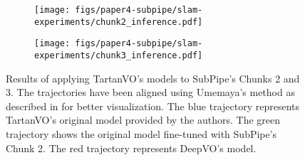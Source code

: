 \begin{figure}[ht]
    \centering
    \begin{subfigure}[b]{0.48\textwidth}
        \centering
        \texttt{[image: figs/paper4-subpipe/slam-experiments/chunk2\_inference.pdf]}
        \caption{}
    \end{subfigure}
    \hfill
    \begin{subfigure}[b]{0.48\textwidth}
        \centering
        \texttt{[image: figs/paper4-subpipe/slam-experiments/chunk3\_inference.pdf]}
        \caption{}
    \end{subfigure}
    \caption[Results of applying TartanVO's and DeepVO models in SubPipe]{Results of applying TartanVO's models to SubPipe's Chunks 2 and 3. The trajectories have been aligned using Umemaya's method as described in \cite{grupp2017evo} for better visualization. The blue trajectory represents TartanVO's original model provided by the authors. The green trajectory shows the original model fine-tuned with SubPipe's Chunk 2. The red trajectory represents DeepVO's model.}
    \label{fig:results-tartanvo-chunk3}
\end{figure}





\begin{table}
\caption[Sample results and mIoU for segmentation]{Sample results (Top) and mIoU (Bottom) for segmentation.}
\label{fig:segmentationresults}
\centering
\footnotesize
{}
\end{table}


